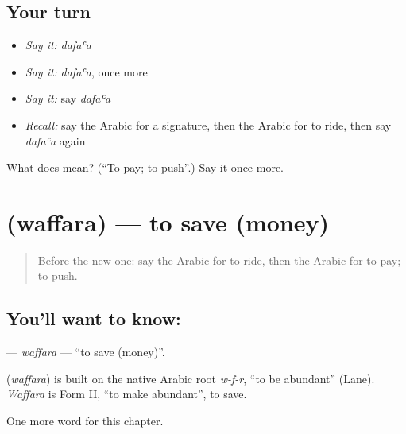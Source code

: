 \subsection*{Your turn}
\begin{itemize}
\raggedright
  \item \emph{Say it:} \emph{dafaʿa}
  \item \emph{Say it:} \emph{dafaʿa}, once more
  \item \emph{Say it:} say \emph{dafaʿa}
  \item \emph{Recall:} say the Arabic for a signature, then the Arabic for to ride, then say \emph{dafaʿa} again
\end{itemize}

\begin{tcolorbox}[breakable,colback=teal!4,colframe=teal!35!black,title={Before you move on}]
What does  mean? (\textquotedblleft{}To pay; to push\textquotedblright{}.) Say it once more.
\end{tcolorbox}
\section[\texorpdfstring{\ar{وفر} (waffara)}{وفر (waffara)}]{ (waffara) — to save (money)}

\label{lesson:AR-C192-waffara}



\begin{quote}
Before the new one: say the Arabic for to ride, then the Arabic for to pay; to push.
\end{quote}

\subsection*{You'll want to know: }
\textbf{} — \emph{waffara} — \textquotedblleft{}to save (money)\textquotedblright{}.

\begin{cousinweb}
\textbf{} (\emph{waffara}) is built on the native Arabic root \emph{w-f-r}, \textquotedblleft{}to be abundant\textquotedblright{} (Lane). \emph{Waffara} is Form II, \textquotedblleft{}to make abundant\textquotedblright{}, to save.
\end{cousinweb}

\begin{grammarlens}[title={What you've built}]
One more word for this chapter.
\end{grammarlens}


